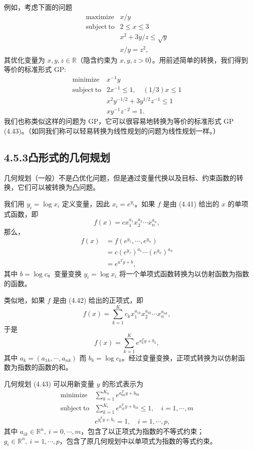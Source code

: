 \documentclass[UTF8, 12pt, fontset=fandol, oneside]{ctexart}
\begin{document}
例如，考虑下面的问题
\[
\begin{array}{ll}
\mathop{\mathrm{maximize}} & x/y\\
\mathrm{subject\ to} & 2\leq x\leq 3\\
& x^2+3y/z\leq \sqrt{y}\\
& x/y=z^2,
\end{array}
\]
其优化变量为 $x,y,z\in\mathbb{R}$（隐含约束为 $x,y,z>0$）。用前述简单的转换，我们得到等价的标准形式 GP:
\[
\begin{array}{ll}
\mathop{\mathrm{minimize}} & x^{-1}y\\
\mathrm{subject\ to} & 2x^{-1}\leq 1,\quad (1/3)x\leq 1\\
& x^2y^{-1/2}+3y^{1/2}z^{-1}\leq 1\\
& xy^{-1}z^{-2}=1.
\end{array}
\]
我们也称类似这样的问题为 GP，它可以很容易地转换为等价的标准形式 GP (4.43)。（如同我们称可以轻易转换为线性规划的问题为线性规划一样。）

\subsection*{4.5.3\quad 凸形式的几何规划}

几何规划（一般）不是凸优化问题，但是通过变量代换以及目标、约束函数的转换，它们可以被转换为凸问题。

我们用 $y_i=\log x_i$ 定义变量，因此 $x_i=e^{y_i}$。如果 $f$ 是由 (4.41) 给出的 $x$ 的单项式函数，即
\[
f(x)=cx_1^{a_1}x_2^{a_2}\cdots x_n^{a_n},
\]
那么，
\[
\begin{aligned}
f(x)&=f(e^{y_1},\cdots,e^{y_n})\\
&=c(e^{y_1})^{a_1}\cdots(e^{y_n})^{a_n}\\
&=e^{a^Ty+b},
\end{aligned}
\]
其中 $b=\log c$。变量变换 $y_i=\log x_i$ 将一个单项式函数转换为以仿射函数为指数的函数。

类似地，如果 $f$ 是由 (4.42) 给出的正项式，即
\[
f(x)=\sum_{k=1}^K c_k x_1^{a_{1k}}x_2^{a_{2k}}\cdots x_n^{a_{nk}},
\]
于是
\[
f(x)=\sum_{k=1}^K e^{a_k^Ty+b_k},
\]
其中 $a_k=(a_{1k},\cdots,a_{nk})$ 而 $b_k=\log c_k$。经过变量变换，正项式转换为以仿射函数为指数的函数的和。

几何规划 (4.43) 可以用新变量 $y$ 的形式表示为
\[
\begin{array}{ll}
\mathop{\mathrm{minimize}} & \displaystyle\sum_{k=1}^{K_0}e^{a_{0k}^Ty+b_{0k}}\\
\mathrm{subject\ to} & \displaystyle\sum_{k=1}^{K_i}e^{a_{ik}^Ty+b_{ik}}\leq 1,\quad i=1,\cdots,m\\
& e^{g_i^Ty+h_i}=1,\quad i=1,\cdots,p,
\end{array}
\]
其中 $a_{ik}\in\mathbb{R}^n,\ i=0,\cdots,m$，包含了以正项式为指数的不等式约束；$g_i\in\mathbb{R}^n,\ i=1,\cdots,p$，包含了原几何规划中以单项式为指数的等式约束。
\end{document}
